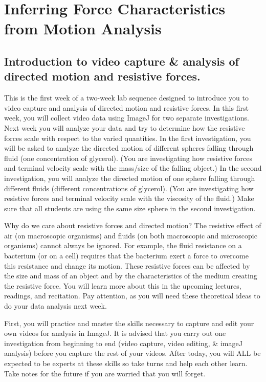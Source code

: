 \chapter{Inferring Force Characteristics from Motion Analysis}
\thispagestyle{fancy}
%
\section{Introduction to video capture \& analysis of directed motion and resistive forces.}
This is the first week of a two-week lab sequence designed to introduce you to video capture and analysis of directed motion and resistive forces.
In this first week, you will collect video data using ImageJ for two separate investigations.
Next week you will analyze your data and try to determine how the resistive forces scale with respect to the varied quantities.
In the first investigation, you will be asked to analyze the directed motion of different spheres falling through fluid (one concentration of glycerol).
(You are investigating how resistive forces and terminal velocity scale with the mass/size of the falling object.)
In the second investigation, you will analyze the directed motion of one sphere falling through different fluids (different concentrations of glycerol).
(You are investigating how resistive forces and terminal velocity scale with the viscosity of the fluid.)
Make sure that all students are using the same size sphere in the second investigation.
\par
Why do we care about resistive forces and directed motion?
The resistive effect of air (on macroscopic organisms) and fluids (on both macroscopic and microscopic organisms) cannot always be ignored.
For example, the fluid resistance on a bacterium (or on a cell) requires that the bacterium exert a force to overcome this resistance and change its motion.
These resistive forces can be affected by the size and mass of an object and by the characteristics of the medium creating the resistive force.
You will learn more about this in the upcoming lectures, readings, and recitation.
Pay attention, as you will need these theoretical ideas to do your data analysis next week. 
\par 
First, you will practice and master the skills necessary to capture and edit your own videos for analysis in ImageJ.
It is advised that you carry out one investigation from beginning to end (video capture, video editing, \& imageJ analysis) before you capture the rest of your videos.
After today, you will ALL be expected to be experts at these skills so take turns and help each other learn.
Take notes for the future if you are worried that you will forget.

